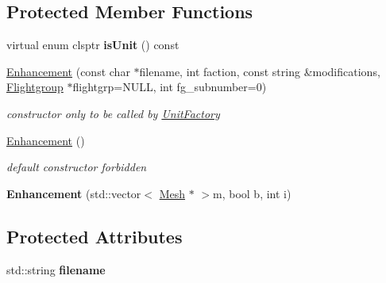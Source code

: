 \subsection*{Protected Member Functions}
\begin{DoxyCompactItemize}
\item 
virtual enum clsptr {\bfseries is\+Unit} () const \hypertarget{classEnhancement_a2604d0f1355ddc601508ff919ee668ef}{}\label{classEnhancement_a2604d0f1355ddc601508ff919ee668ef}

\item 
\hyperlink{classEnhancement_a398e2223c902bbee5058d412fa9e1705}{Enhancement} (const char $\ast$filename, int faction, const string \&modifications, \hyperlink{classFlightgroup}{Flightgroup} $\ast$flightgrp=N\+U\+LL, int fg\+\_\+subnumber=0)\hypertarget{classEnhancement_a398e2223c902bbee5058d412fa9e1705}{}\label{classEnhancement_a398e2223c902bbee5058d412fa9e1705}

\begin{DoxyCompactList}\small\item\em constructor only to be called by \hyperlink{classUnitFactory}{Unit\+Factory} \end{DoxyCompactList}\item 
\hyperlink{classEnhancement_ab348c08841ab57c76daa7c3eab2ad4a3}{Enhancement} ()\hypertarget{classEnhancement_ab348c08841ab57c76daa7c3eab2ad4a3}{}\label{classEnhancement_ab348c08841ab57c76daa7c3eab2ad4a3}

\begin{DoxyCompactList}\small\item\em default constructor forbidden \end{DoxyCompactList}\item 
{\bfseries Enhancement} (std\+::vector$<$ \hyperlink{classMesh}{Mesh} $\ast$ $>$m, bool b, int i)\hypertarget{classEnhancement_ae281ed9b1c567ead4650f9ce66d964b8}{}\label{classEnhancement_ae281ed9b1c567ead4650f9ce66d964b8}

\end{DoxyCompactItemize}
\subsection*{Protected Attributes}
\begin{DoxyCompactItemize}
\item 
std\+::string {\bfseries filename}\hypertarget{classEnhancement_a3f6974a16ef585a8b339324a04f9a898}{}\label{classEnhancement_a3f6974a16ef585a8b339324a04f9a898}

\end{DoxyCompactItemize}
